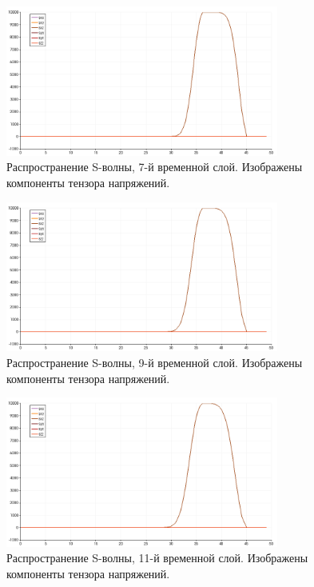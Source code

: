 \begin{figure}[htp]
\centering
\includegraphics[width=0.8\textwidth]{png/s-wave-test/s/0007.png}
\caption{Распространение S-волны, 7-й временной слой. Изображены компоненты тензора напряжений.}
\end{figure}

\begin{figure}[htp]
\centering
\includegraphics[width=0.8\textwidth]{png/s-wave-test/s/0009.png}
\caption{Распространение S-волны, 9-й временной слой. Изображены компоненты тензора напряжений.}
\end{figure}

\begin{figure}[htp]
\centering
\includegraphics[width=0.8\textwidth]{png/s-wave-test/s/0011.png}
\caption{Распространение S-волны, 11-й временной слой. Изображены компоненты тензора напряжений.}
\end{figure}

